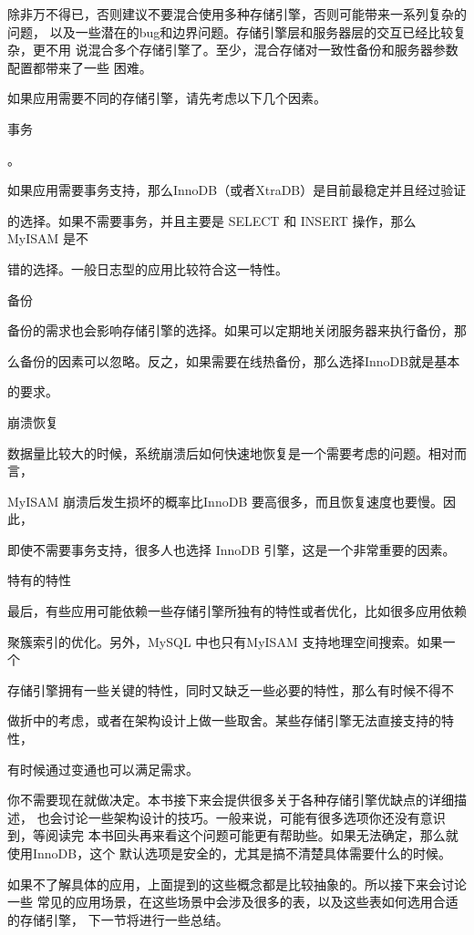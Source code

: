 除非万不得已，否则建议不要混合使用多种存储引擎，否则可能带来一系列复杂的问题，
以及一些潜在的bug和边界问题。存储引擎层和服务器层的交互已经比较复杂，更不用
说混合多个存储引擎了。至少，混合存储对一致性备份和服务器参数配置都带来了一些
困难。

如果应用需要不同的存储引擎，请先考虑以下几个因素。

事务

。

如果应用需要事务支持，那么InnoDB（或者XtraDB）是目前最稳定并且经过验证

的选择。如果不需要事务，并且主要是 SELECT 和 INSERT 操作，那么MyISAM 是不

错的选择。一般日志型的应用比较符合这一特性。

备份

备份的需求也会影响存储引擎的选择。如果可以定期地关闭服务器来执行备份，那

么备份的因素可以忽略。反之，如果需要在线热备份，那么选择InnoDB就是基本

的要求。

崩溃恢复

数据量比较大的时候，系统崩溃后如何快速地恢复是一个需要考虑的问题。相对而言，

MyISAM 崩溃后发生损坏的概率比InnoDB 要高很多，而且恢复速度也要慢。因此，

即使不需要事务支持，很多人也选择 InnoDB 引擎，这是一个非常重要的因素。

特有的特性

最后，有些应用可能依赖一些存储引擎所独有的特性或者优化，比如很多应用依赖

聚簇索引的优化。另外，MySQL 中也只有MyISAM 支持地理空间搜索。如果一个

存储引擎拥有一些关键的特性，同时又缺乏一些必要的特性，那么有时候不得不

做折中的考虑，或者在架构设计上做一些取舍。某些存储引擎无法直接支持的特性，

有时候通过变通也可以满足需求。

你不需要现在就做决定。本书接下来会提供很多关于各种存储引擎优缺点的详细描述，
也会讨论一些架构设计的技巧。一般来说，可能有很多选项你还没有意识到，等阅读完
本书回头再来看这个问题可能更有帮助些。如果无法确定，那么就使用InnoDB，这个
默认选项是安全的，尤其是搞不清楚具体需要什么的时候。

如果不了解具体的应用，上面提到的这些概念都是比较抽象的。所以接下来会讨论一些
常见的应用场景，在这些场景中会涉及很多的表，以及这些表如何选用合适的存储引擎，
下一节将进行一些总结。

